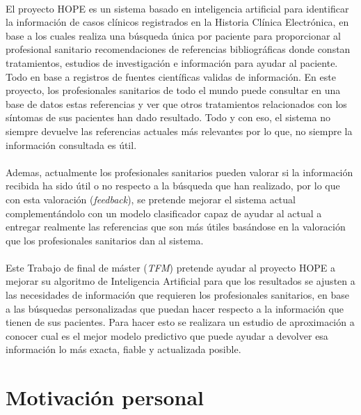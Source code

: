 \paragraph{}
El proyecto HOPE es un sistema basado en inteligencia artificial para identificar la información de casos clínicos registrados en la Historia Clínica Electrónica, en base a los cuales realiza una búsqueda única por paciente para proporcionar al profesional sanitario recomendaciones de referencias bibliográficas donde constan tratamientos, estudios de investigación e información para ayudar al paciente. Todo en base a registros de fuentes científicas validas de información. En este proyecto, los profesionales sanitarios de todo el mundo puede consultar en una base de datos estas referencias y ver que otros tratamientos relacionados con los síntomas de sus pacientes han dado resultado. Todo y con eso, el sistema no siempre devuelve las referencias actuales más relevantes por lo que, no siempre la información consultada es útil\cite{ref:pfm_karla}.

\paragraph{}
Ademas, actualmente los profesionales sanitarios pueden valorar si la información recibida ha sido útil o no respecto a la búsqueda que han realizado, por lo que con esta valoración (\textit{feedback}), se pretende mejorar el sistema actual complementándolo con un modelo clasificador capaz de ayudar al actual a entregar realmente las referencias que son más útiles basándose en la valoración que los profesionales sanitarios dan al sistema.

\paragraph{}
Este Trabajo de final de máster (\textit{TFM}) pretende ayudar al proyecto HOPE a mejorar su algoritmo de Inteligencia Artificial para que los resultados se ajusten a las necesidades de información que requieren los profesionales sanitarios, en base a las búsquedas personalizadas que puedan hacer respecto a la información que tienen de sus pacientes. Para hacer esto se realizara un estudio de aproximación a conocer cual es el mejor modelo predictivo que puede ayudar a devolver esa información lo más exacta, fiable y actualizada posible.

\section{Motivación personal}

